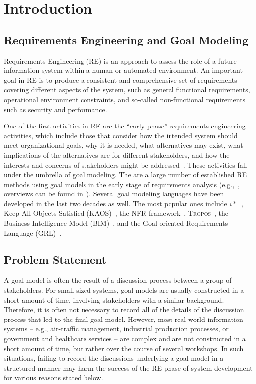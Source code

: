 \section{Introduction}
\label{sect:introduction}

\subsection{Requirements Engineering and Goal Modeling}

Requirements Engineering (RE) is an approach to assess the role of a future information system within a human or automated environment. An important goal in RE is to produce a consistent and comprehensive set of requirements covering different aspects of the system, such as general functional requirements, operational environment constraints, and so-called non-functional requirements such as security and performance. 

One of the first activities in RE are the ``early-phase'' requirements engineering activities, which include those that consider how the intended system should meet organizational goals, why it is needed, what alternatives may exist, what implications of the alternatives are for different stakeholders, and how the interests and concerns of stakeholders might be addressed~\cite{yu1997towards}. These activities fall under the umbrella of goal modeling. The are a large number of established RE methods using goal models in the early stage of requirements analysis (e.g.,~\cite{liu2004designing,donzelli2004goal,dardenne1993goal,chung2012non,castro2002towards}, overviews can be found in~\cite{van2001goal,kavakliL05}). Several goal modeling languages have been developed in the last two decades as well. The most popular ones include $i*$~\cite{Yu:1997:TMR:827255.827807}, Keep All Objects Satisfied (KAOS)~\cite{van2008requirements}, the NFR framework~\cite{chung2012non}, \textsc{Tropos}~\cite{giorgini2005goal}, the Business Intelligence Model (BIM)~\cite{horkoff2014strategic}, and the Goal-oriented Requirements Language (GRL)~\cite{Amyot:2010:EGM:1841349.1841356}.

\subsection{Problem Statement}
\label{sect:problem_statement}


A goal model is often the result of a discussion process between a group of stakeholders. For small-sized systems, goal models are usually constructed in a short amount of time, involving stakeholders with a similar background. Therefore, it is often not necessary to record all of the details of the discussion process that led to the final goal model. However, most real-world information systems -- e.g., air-traffic management, industrial production processes, or government and healthcare services -- are complex and are not constructed in a short amount of time, but rather over the course of several workshops. In such situations, failing to record the discussions underlying a goal model in a structured manner may harm the success of the RE phase of system development for various reasons stated below. 


